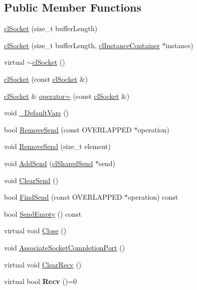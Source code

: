 \subsection*{Public Member Functions}
\begin{DoxyCompactItemize}
\item 
\hyperlink{classcl_socket_aea097250d267f081b56c0bcda48e210f}{clSocket} (size\_\-t bufferLength)
\item 
\hyperlink{classcl_socket_a331fae974dc5e685d4814e2f2254208d}{clSocket} (size\_\-t bufferLength, \hyperlink{classcl_instance_container}{clInstanceContainer} $\ast$instance)
\item 
virtual \hyperlink{classcl_socket_a9872767d3f8a21f6568b4a79c3bddee4}{$\sim$clSocket} ()
\item 
\hyperlink{classcl_socket_ad5702fb888ecb38b07eb536273aa5414}{clSocket} (const \hyperlink{classcl_socket}{clSocket} \&)
\item 
\hyperlink{classcl_socket}{clSocket} \& \hyperlink{classcl_socket_a04028c4342b924ffc1a6749c35d57c32}{operator=} (const \hyperlink{classcl_socket}{clSocket} \&)
\item 
void \hyperlink{classcl_socket_a63910e1657650a9ff3e8c8cb6045e689}{\_\-DefaultVars} ()
\item 
bool \hyperlink{classcl_socket_a87f0f9dfc4b26d21efc45a3551ab988b}{RemoveSend} (const OVERLAPPED $\ast$operation)
\item 
void \hyperlink{classcl_socket_ae28db191f5750e83f187e37939b596ad}{RemoveSend} (size\_\-t element)
\item 
void \hyperlink{classcl_socket_aacb725d66067230ade23633e34a0d02d}{AddSend} (\hyperlink{classcl_shared_send}{clSharedSend} $\ast$send)
\item 
void \hyperlink{classcl_socket_a2398b25d1c446b27f55f2e12632a0f17}{ClearSend} ()
\item 
bool \hyperlink{classcl_socket_adfe8b1383f71d3569be05859ba1d55bd}{FindSend} (const OVERLAPPED $\ast$operation) const 
\item 
bool \hyperlink{classcl_socket_abdf3ff3b62ae2401576e5ae294ef53e3}{SendEmpty} () const 
\item 
virtual void \hyperlink{classcl_socket_a5ff0b79fb0cb1c43019e726ea085ec36}{Close} ()
\item 
void \hyperlink{classcl_socket_a68a48be55c5638db5fbf61d652318de4}{AssociateSocketCompletionPort} ()
\item 
virtual void \hyperlink{classcl_socket_a45284c4d4679469dd9cf11cf08faa86c}{ClearRecv} ()
\item 
\hypertarget{classcl_socket_abf64bc817795c6fcd5dd5f28c8ab6abb}{
virtual bool {\bfseries Recv} ()=0}
\label{classcl_socket_abf64bc817795c6fcd5dd5f28c8ab6abb}


\end{DoxyCompactItemize}
